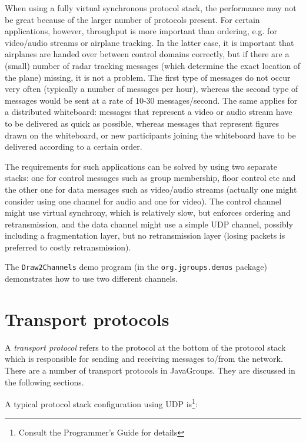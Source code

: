   When using a fully virtual synchronous protocol stack, the performance may not be
  great because of the larger number of protocols present. For certain applications,
  however, throughput is more important than ordering, e.g. for video/audio streams
  or airplane tracking. In the latter case, it is important that airplanes are handed
  over between control domains correctly, but if there are a (small) number of radar
  tracking messages (which determine the exact location of the plane) missing, it is
  not a problem. The first type of messages do not occur very often (typically a
  number of messages per hour), whereas the second type of messages would be sent at
  a rate of 10-30 messages/second. The same applies for a distributed whiteboard:
  messages that represent a video or audio stream have to be delivered as quick as
  possible, whereas messages that represent figures drawn on the whiteboard, or new
  participants joining the whiteboard have to be delivered according to a certain
  order.

  The requirements for such applications can be solved by using two separate stacks:
  one for control messages such as group membership, floor control etc and the other
  one for data messages such as video/audio streams (actually one might consider
  using one channel for audio and one for video). The control channel might use
  virtual synchrony, which is relatively slow, but enforces ordering and
  retransmission, and the data channel might use a simple UDP channel, possibly
  including a fragmentation layer, but no retransmission layer (losing packets is
  preferred to costly retransmission).

  The {\tt Draw2Channels} demo program (in the {\tt org.jgroups.demos} package)
  demonstrates how to use two different channels.






  \section{Transport protocols}

  A {\em transport protocol} refers to the protocol at the bottom of the protocol
  stack which is responsible for sending and receiving messages to/from the
  network. There are a number of transport protocols in JavaGroups. They are
  discussed in the following sections.

  A typical protocol stack configuration using UDP is\footnote{Consult the
  Programmer's Guide for details}:

